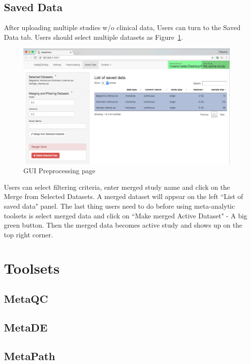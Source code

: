 \documentclass{article}
\begin{document}
\subsection{Saved Data}
After uploading multiple studies w/o clinical data,
Users can turn to the Saved Data tab.
Users should select multiple datasets as Figure~\ref{fig:GUImerge}.
\begin{figure}[H]
\begin{center}
\includegraphics[scale=0.35]{./figure/GUImerge}
\caption{GUI Preprocessing page}
\label{fig:GUImerge}
\end{center}
\end{figure}
Users can select filtering criteria, enter merged study name and click on the Merge from Selected Datasets.
A merged dataset will appear on the left ``List of saved data" panel.
The last thing users need to do before using meta-analytic toolsets is select merged data and click on 
``Make merged Active Dataset" - A big green button.
Then the merged data becomes active study and shows up on the top right corner.

\section{Toolsets}


\subsection{MetaQC}

\subsection{MetaDE}

\subsection{MetaPath}
\end{document}
